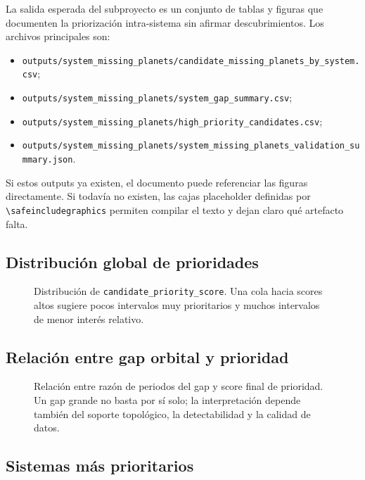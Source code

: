 La salida esperada del subproyecto es un conjunto de tablas y figuras que documenten la priorizaci\'on intra-sistema sin afirmar descubrimientos. Los archivos principales son:
\begin{itemize}
\item \texttt{outputs/system\_missing\_planets/candidate\_missing\_planets\_by\_system.csv};
\item \texttt{outputs/system\_missing\_planets/system\_gap\_summary.csv};
\item \texttt{outputs/system\_missing\_planets/high\_priority\_candidates.csv};
\item \texttt{outputs/system\_missing\_planets/system\_missing\_planets\_validation\_summary.json}.
\end{itemize}

Si estos outputs ya existen, el documento puede referenciar las figuras directamente. Si todav\'ia no existen, las cajas placeholder definidas por \verb|\safeincludegraphics| permiten compilar el texto y dejan claro qu\'e artefacto falta.

\subsection{Distribuci\'on global de prioridades}

\begin{figure}[H]
\centering
{}
\caption{Distribuci\'on de \texttt{candidate\_priority\_score}. Una cola hacia scores altos sugiere pocos intervalos muy prioritarios y muchos intervalos de menor inter\'es relativo.}
\label{fig:priority-distribution}
\end{figure}

\subsection{Relaci\'on entre gap orbital y prioridad}

\begin{figure}[H]
\centering
{}
\caption{Relaci\'on entre raz\'on de periodos del gap y score final de prioridad. Un gap grande no basta por s\'i solo; la interpretaci\'on depende tambi\'en del soporte topol\'ogico, la detectabilidad y la calidad de datos.}
\label{fig:gap-vs-priority}
\end{figure}

\subsection{Sistemas m\'as prioritarios}

